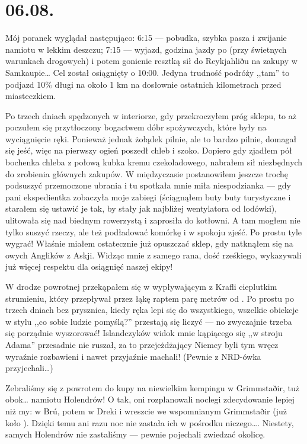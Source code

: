 \chapter*{06.08.}

Mój poranek wyglądał następująco: 6:15 --- pobudka, szybka pasza i zwijanie namiotu w lekkim deszczu; 7:15 --- wyjazd, godzina jazdy po  (przy świetnych warunkach drogowych) i potem gonienie resztką sił do Reykjahliðu na zakupy w Samkaupie… Cel został osiągnięty o 10:00. Jedyna trudność podróży ,,tam'' to podjazd 10\% długi na około 1 km na dosłownie ostatnich kilometrach przed miasteczkiem.

Po trzech dniach spędzonych w interiorze, gdy przekroczyłem próg sklepu, to aż poczułem się przytłoczony bogactwem dóbr spożywczych, które były na wyciągnięcie ręki. Ponieważ jednak żołądek pilnie, ale to bardzo pilnie, domagał się jeść, więc na pierwszy ogień poszedł chleb i szoko. Dopiero gdy zjadłem pół bochenka chleba z połową kubka kremu czekoladowego, nabrałem sił niezbędnych do zrobienia głównych zakupów. W międzyczasie postanowiłem jeszcze trochę podsuszyć przemoczone ubrania i tu spotkała mnie miła niespodzianka --- gdy pani ekspedientka zobaczyła moje zabiegi (ściągnąłem buty buty turystyczne i starałem się ustawić je tak, by stały jak najbliżej wentylatora od lodówki), ulitowała się nad biednym rowerzystą i zaprosiła do kotłowni. A tam mogłem nie tylko suszyć rzeczy, ale też podładować komórkę i w spokoju zjeść. Po prostu tyle wygrać! Właśnie miałem ostatecznie już opuszczać sklep, gdy natknąłem się na owych Anglików z Askji. Widząc mnie z samego rana, dość rześkiego, wykazywali już więcej respektu dla osiągnięć naszej ekipy!

W drodze powrotnej przekąpałem się w wypływającym z Krafli cieplutkim strumieniu, który przepływał przez łąkę raptem parę metrów od . Po prostu po trzech dniach bez prysznica, kiedy ręka lepi się do wszystkiego, wszelkie obiekcje w stylu ,,co sobie ludzie pomyślą?'' przestają się liczyć --- no zwyczajnie trzeba się porządnie wyszorować! Islandczyków widok mnie kąpiącego się ,,w stroju Adama'' przesadnie nie ruszał, za to przejeżdżający Niemcy byli tym wręcz wyraźnie rozbawieni i nawet przyjaźnie machali! (Pewnie z NRD-ówka przyjechali…)

Zebraliśmy się z powrotem do kupy na niewielkim kempingu w Grimmstaðir, tuż obok… namiotu Holendrów! O tak, oni rozplanowali noclegi zdecydowanie lepiej niż my: w Brú, potem w Dreki i wreszcie we wspomnianym Grimmstaðir (już koło ). Dzięki temu ani razu noc nie zastała ich w pośrodku niczego…. Niestety, samych Holendrów nie zastaliśmy --- pewnie pojechali zwiedzać okolicę.

